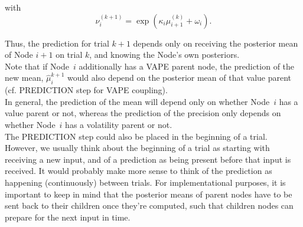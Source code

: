 \noindent
{}%
\vspace{0.5cm}

\noindent
with
\begin{equation*}
\nu_i^{(k+1)} = \exp(\kappa_i \mu_{i+1}^{(k)} + \omega_i).
\end{equation*}

Thus, the prediction for trial $k+1$ depends only on receiving the posterior mean of Node $i+1$ on trial $k$, and knowing the Node's own posteriors.\\

Note that if Node~$i$ additionally has a \textsf{VAPE} parent node, the prediction of the new mean, $\hat{\mu}_i^{k+1}$ would also depend on the posterior mean of that value parent (cf. \textsf{PREDICTION step} for \textsf{VAPE} coupling).\\

In general, the prediction of the mean will depend only on whether Node~$i$ has a value parent or not, whereas the prediction of the precision only depends on whether Node~$i$ has a volatility parent or not. \\

The \textsf{PREDICTION step} could also be placed in the beginning of a trial. However, we usually think about the beginning of a trial as starting with receiving a new input, and of a prediction as being present before that input is received. It would probably make more sense to think of the prediction as happening (continuously) between trials. For implementational purposes, it is important to keep in mind that the posterior means of parent nodes have to be sent back to their children once they're computed, such that children nodes can prepare for the next input in time.

